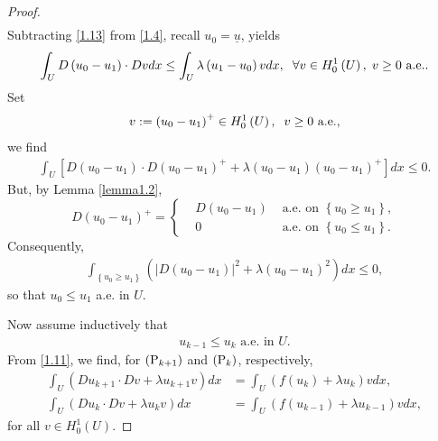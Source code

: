 \documentclass[11pt,a4paper,center,notitlepage]{article}
\numberwithin{equation}{section}
\begin{document}
\begin{proof}
\begin{align}
\end{align}
Subtracting \eqref{1.13} from \eqref{1.4}, recall $u_0=\underline{u}$, yields
\begin{align}
\int_U {D\left( {{u_0} - {u_1}} \right) \cdot Dvdx}  \le \int_U {\lambda \left( {{u_1} - {u_0}} \right)vdx} ,\hspace{2mm}\forall v \in H_0^1\left( U \right), \hspace{1mm} v\ge 0 \mbox{ a.e.}.
\end{align}
Set
\begin{align}
v: = {\left( {{u_0} - {u_1}} \right)^ + } \in H_0^1\left( U \right),\hspace{2mm} v \ge 0 \mbox{ a.e.},
\end{align}
we find
\begin{align}
\int_U {\left[ {D\left( {{u_0} - {u_1}} \right) \cdot D{{\left( {{u_0} - {u_1}} \right)}^ + } + \lambda \left( {{u_0} - {u_1}} \right){{\left( {{u_0} - {u_1}} \right)}^ + }} \right]dx}  \le 0.
\end{align}
But, by Lemma \ref{lemma1.2},
\begin{equation}
D{\left( {{u_0} - {u_1}} \right)^ + } = \left\{ \begin{split}
&D\left( {{u_0} - {u_1}} \right) & \mbox{ a.e. on } \left\{ {{u_0} \ge {u_1}} \right\},\\
&0 & \mbox{ a.e. on } \left\{ {{u_0} \le {u_1}} \right\}.
\end{split} \right.
\end{equation}
Consequently,
\begin{align}
\int_{\left\{ {{u_0} \ge {u_1}} \right\}} {\left( {{{\left| {D\left( {{u_0} - {u_1}} \right)} \right|}^2} + \lambda {{\left( {{u_0} - {u_1}} \right)}^2}} \right)dx}  \le 0,
\end{align}
so that $u_0 \le u_1$ a.e. in $U$. 

Now assume inductively that 
\begin{align}
\label{1.19}
u_{k-1} \le u_k \mbox{ a.e. in }U.
\end{align}
From \eqref{1.11}, we find, for $\left({\rm P}_{k+1}\right)$ and $\left({\rm P}_k\right)$, respectively,
\begin{align}
\label{1.20}
\int_U {\left( {D{u_{k + 1}} \cdot Dv + \lambda {u_{k + 1}}v} \right)dx}  &= \int_U {\left( {f\left( {{u_k}} \right) + \lambda {u_k}} \right)vdx} ,\\
\int_U {\left( {D{u_k} \cdot Dv + \lambda {u_k}v} \right)dx}  &= \int_U {\left( {f\left( {{u_{k - 1}}} \right) + \lambda {u_{k - 1}}} \right)vdx} ,
\end{align}
for all $v \in H_0^1\left( U \right)$. 


\end{proof}
\end{document}
